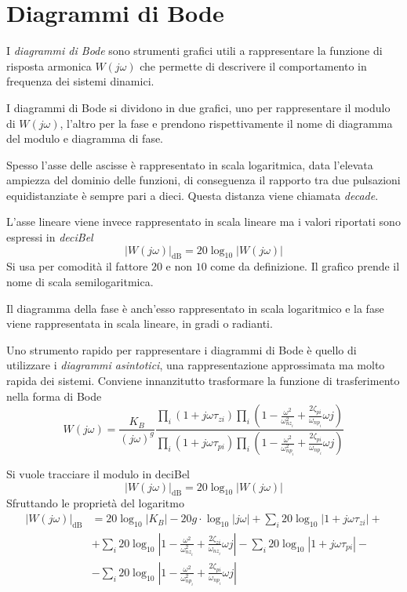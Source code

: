
\section{Diagrammi di Bode}
I \textit{diagrammi di Bode} sono strumenti grafici utili a rappresentare la
funzione di risposta armonica $W(j\omega)$ che permette di descrivere il
comportamento in frequenza dei sistemi dinamici.

I diagrammi di Bode si dividono in due grafici, uno per rappresentare il modulo
di $W(j\omega)$, l'altro per la fase e prendono rispettivamente il nome di
diagramma del modulo e diagramma di fase.

Spesso l'asse delle ascisse è rappresentato in scala logaritmica, data
l'elevata ampiezza del dominio delle funzioni, di conseguenza il rapporto tra
due pulsazioni equidistanziate è sempre pari a dieci.
Questa distanza viene chiamata \textit{decade}.

L'asse lineare viene invece rappresentato in scala lineare ma i valori
riportati sono espressi in \textit{deciBel}
$$
|W(j\omega)|_{\si{\deci\bel}} = 20\log_{10}|W(j\omega)|
$$
Si usa per comodità il fattore $20$ e non $10$ come da definizione.
Il grafico prende il nome di scala semilogaritmica.
\begin{figure}[h]
\centering
{}
\end{figure}

Il diagramma della fase è anch'esso rappresentato in scala logaritmico e la
fase viene rappresentata in scala lineare, in gradi o radianti.

Uno strumento rapido per rappresentare i diagrammi di Bode è quello di
utilizzare i \textit{diagrammi asintotici}, una rappresentazione approssimata
ma molto rapida dei sistemi.
Conviene innanzitutto trasformare la funzione di trasferimento nella forma di
Bode
$$
W(j\omega) = \frac{K_B}{(j\omega)^g} \frac{\prod_i (1+j\omega \tau_{zi})
\prod_i (1-\frac{\omega^2}{\omega_{nz_i}^2} +
\frac{2\zeta_{pi}}{\omega_{np_i}}\omega j) }
{\prod_i (1+j\omega \tau_{pi})
\prod_i (1-\frac{\omega^2}{\omega_{np_i}^2} +
\frac{2\zeta_{pi}}{\omega_{np_i}}\omega j) }
$$

Si vuole tracciare il modulo in deciBel
$$
|W(j\omega)|_{\si{\deci\bel}} = 20\log_{10}|W(j\omega)|
$$
Sfruttando le proprietà del logaritmo
$$\begin{aligned}
|W(j\omega)|_{\si{\deci\bel}} &= 20\log_{10}|K_B|-20g\cdot\log_{10}|j\omega| +
\sum_i 20\log_{10}|1+j\omega\tau_{zi}| + \\
&+\sum_i 20 \log_{10}
\left|1-\frac{\omega^2}{\omega_{nz_i}^2} +
\frac{2\zeta_{zi}}{\omega_{nz_i}}\omega j\right|
- \sum_i 20\log_{10}|1+j\omega\tau_{pi}| -\\
&-\sum_i 20 \log_{10}
\left|1-\frac{\omega^2}{\omega_{np_i}^2} +
\frac{2\zeta_{pi}}{\omega_{np_i}}\omega j\right|
\end{aligned}$$


